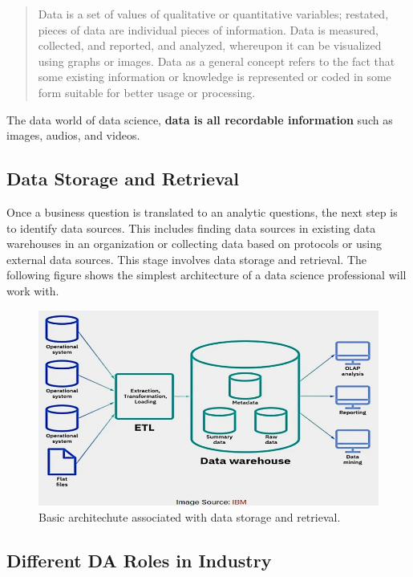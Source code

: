 \documentclass[
]{book}
\begin{document}
\begin{quote}
Data is a set of values of qualitative or quantitative variables; restated, pieces of data are individual pieces of information. Data is measured, collected, and reported, and analyzed, whereupon it can be visualized using graphs or images. Data as a general concept refers to the fact that some existing information or knowledge is represented or coded in some form suitable for better usage or processing.
\end{quote}

The data world of data science, \textbf{data is all recordable information} such as images, audios, and videos.

\hypertarget{data-storage-and-retrieval}{%
\subsection{Data Storage and Retrieval}\label{data-storage-and-retrieval}}

Once a business question is translated to an analytic questions, the next step is to identify data sources. This includes finding data sources in existing data warehouses in an organization or collecting data based on protocols or using external data sources. This stage involves data storage and retrieval. The following figure shows the simplest architecture of a data science professional will work with.

\begin{figure}

{\centering \includegraphics[width=0.9\linewidth]{img01/w01-StorageRetrieval} 

}

\caption{Basic architechute associated with data storage and retrieval.}\label{fig:unnamed-chunk-5}
\end{figure}

\hypertarget{different-da-roles-in-industry}{%
\subsection{Different DA Roles in Industry}\label{different-da-roles-in-industry}}
\end{document}
